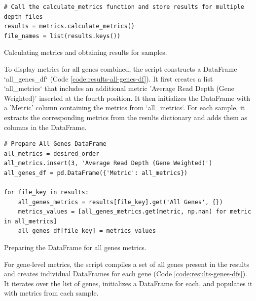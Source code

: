 \begin{longlisting}
\begin{verbatim}
# Call the calculate_metrics function and store results for multiple depth files
results = metrics.calculate_metrics()
file_names = list(results.keys())
\end{verbatim}
\caption{Calculating metrics and obtaining results for samples.}
\label{code:results-calculate-metrics}
\end{longlisting}

To display metrics for all genes combined, the script constructs a DataFrame `all\_genes\_df` (Code \ref{code:results-all-genes-df}). It first creates a list `all\_metrics` that includes an additional metric 'Average Read Depth (Gene Weighted)' inserted at the fourth position. It then initializes the DataFrame with a 'Metric' column containing the metrics from `all\_metrics`. For each sample, it extracts the corresponding metrics from the results dictionary and adds them as columns in the DataFrame.

\begin{longlisting}
\begin{verbatim}
# Prepare All Genes DataFrame
all_metrics = desired_order
all_metrics.insert(3, 'Average Read Depth (Gene Weighted)')
all_genes_df = pd.DataFrame({'Metric': all_metrics})

for file_key in results:
    all_genes_metrics = results[file_key].get('All Genes', {})
    metrics_values = [all_genes_metrics.get(metric, np.nan) for metric in all_metrics]
    all_genes_df[file_key] = metrics_values
\end{verbatim}
\caption{Preparing the DataFrame for all genes metrics.}
\label{code:results-all-genes-df}
\end{longlisting}

For gene-level metrics, the script compiles a set of all genes present in the results and creates individual DataFrames for each gene (Code \ref{code:results-genes-dfs}). It iterates over the list of genes, initializes a DataFrame for each, and populates it with metrics from each sample.

